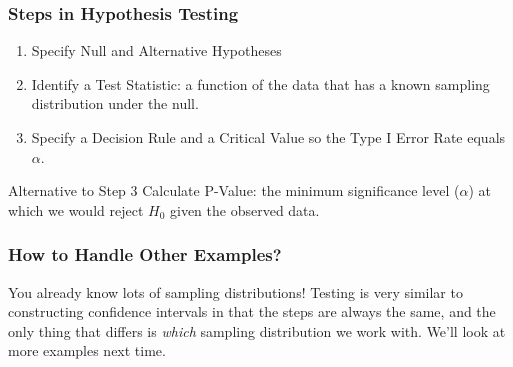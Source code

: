\begin{frame}
\frametitle{Steps in Hypothesis Testing}

\begin{enumerate}
\item Specify Null and Alternative Hypotheses
\item Identify a Test Statistic: a function of the data that has a known sampling distribution under the null.
\item Specify a Decision Rule and a Critical Value so the Type I Error Rate equals $\alpha$.
\end{enumerate}

\begin{alertblock}{Alternative to Step 3}
	Calculate P-Value: the minimum significance level  ($\alpha$) at which we would reject $H_0$ given the observed data.
\end{alertblock}

\end{frame}


\begin{frame}
\frametitle{How to Handle Other Examples?}

\alert{You already know lots of sampling distributions! Testing is very similar to constructing confidence intervals in that the steps are always the same, and the only thing that differs is \emph{which} sampling distribution we work with. We'll look at more examples next time.}

\end{frame}


